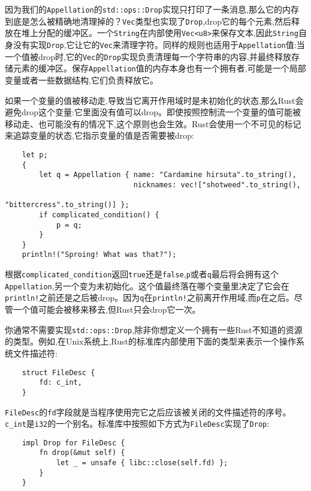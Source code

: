 因为我们的\texttt{Appellation}的\texttt{std::ops::Drop}实现只打印了一条消息,那么它的内存到底是怎么被精确地清理掉的？\texttt{Vec}类型也实现了\texttt{Drop},drop它的每个元素,然后释放在堆上分配的缓冲区。一个\texttt{String}在内部使用\texttt{Vec<u8>}来保存文本,因此\texttt{String}自身没有实现\texttt{Drop},它让它的\texttt{Vec}来清理字符。同样的规则也适用于\texttt{Appellation}值:当一个值被drop时,它的\texttt{Vec}的\texttt{Drop}实现负责清理每一个字符串的内容,并最终释放存储元素的缓冲区。保存\texttt{Appellation}值的内存本身也有一个拥有者,可能是一个局部变量或者一些数据结构,它们负责释放它。

如果一个变量的值被移动走,导致当它离开作用域时是未初始化的状态,那么Rust会避免drop这个变量:它里面没有值可以drop。即使按照控制流一个变量的值可能被移动走、也可能没有的情况下,这个原则也会生效。Rust会使用一个不可见的标记来追踪变量的状态,它指示变量的值是否需要被drop:
\begin{verbatim}
    let p;
    {
        let q = Appellation { name: "Cardamine hirsuta".to_string(),
                              nicknames: vec!["shotweed".to_string(),
                                              "bittercress".to_string()] };
        if complicated_condition() {
            p = q;
        }
    }
    println!("Sproing! What was that?");
\end{verbatim}

根据\texttt{complicated\_condition}返回\texttt{true}还是\texttt{false},\texttt{p}或者\texttt{q}最后将会拥有这个\texttt{Appellation},另一个变为未初始化。这个值最终落在哪个变量里决定了它会在\texttt{println!}之前还是之后被drop。因为\texttt{q}在\texttt{println!}之前离开作用域,而\texttt{p}在之后。尽管一个值可能会被移来移去,但Rust只会drop它一次。

你通常不需要实现\texttt{std::ops::Drop},除非你想定义一个拥有一些Rust不知道的资源的类型。例如,在Unix系统上,Rust的标准库内部使用下面的类型来表示一个操作系统文件描述符:
\begin{verbatim}
    struct FileDesc {
        fd: c_int,
    }
\end{verbatim}

\texttt{FileDesc}的\texttt{fd}字段就是当程序使用完它之后应该被关闭的文件描述符的序号。\texttt{c\_int}是\texttt{i32}的一个别名。标准库中按照如下方式为\texttt{FileDesc}实现了\texttt{Drop}:
\begin{verbatim}
    impl Drop for FileDesc {
        fn drop(&mut self) {
            let _ = unsafe { libc::close(self.fd) };
        }
    }
\end{verbatim}

